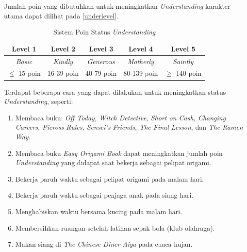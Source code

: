 Jumlah poin yang dibutuhkan untuk meningkatkan \textit{Understanding} karakter utama dapat dilihat pada \autoref{underlevel}.
\begin{table}[H]
    \caption{\label{underlevel}Sistem Poin Status \textit{Understanding}}
    \begin{center}
        \begin{tabular}{ | c | c | c | c | c | }
            \hline
            \textbf{Level 1} & \textbf{Level 2} & \textbf{Level 3}  & \textbf{Level 4}  & \textbf{Level 5} \\
            \hline
            \textit{Basic}   & \textit{Kindly}  & \textit{Generous} & \textit{Motherly} & \textit{Saintly} \\
            \hline
            $\le$ 15 poin    & 16-39 poin       & 40-79 poin        & 80-139 poin       & $\ge$ 140 poin   \\
            \hline
        \end{tabular}
    \end{center}
\end{table}

Terdapat beberapa cara yang dapat dilakukan untuk meningkatkan status \textit{Understanding}, seperti:
\begin{enumerate}
    \item Membaca buku: \textit{Off Today, Witch Detective, Short on Cash, Changing Careers, Picross Rules, Sensei’s Friends, The Final Lesson}, dan \textit{The Ramen Way}.
    \item Membaca buku \textit{Easy Origami Book} dapat meningkatkan jumlah poin \textit{Understanding} yang didapat saat bekerja sebagai pelipat origami.
    \item Bekerja paruh waktu sebagai pelipat origami pada malam hari.
    \item Bekerja paruh waktu sebagai penjaga anak pada siang hari.
    \item Menghabiskan waktu bersama kucing pada malam hari.
    \item Membersihkan ruangan setelah latihan sepak bola (klub olahraga).
    \item Makan siang di \textit{The Chinese Diner Aiya} pada cuaca hujan.
\end{enumerate}

